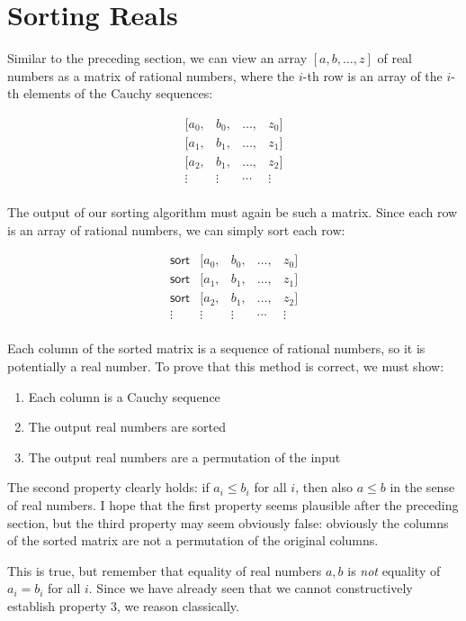 \documentclass[a4paper, 11pt]{article}
\newcommand{\sort}{\mathsf{sort}}
\begin{document}
\section{Sorting Reals}

Similar to the preceding section, we can view an array $[a, b,\dots,z]$ of real numbers as a matrix of rational numbers, where the $i$-th row is an array of the $i$-th elements of the Cauchy sequences:

\[
\begin{matrix}
  [a_0, & b_0, & \dots, & z_0] \\
  [a_1, & b_1, & \dots, & z_1] \\
  [a_2, & b_1, & \dots, & z_2] \\
  \vdots & \vdots & \cdots & \vdots \\
\end{matrix}
\]

The output of our sorting algorithm must again be such a matrix. Since each row is an array of rational numbers, we can simply sort each row:

\[
\begin{matrix}
  \sort &[a_0, & b_0, & \dots, & z_0] \\
  \sort &[a_1, & b_1, & \dots, & z_1] \\
  \sort &[a_2, & b_1, & \dots, & z_2] \\
  \vdots&  \vdots & \vdots & \cdots & \vdots \\
\end{matrix}
\]

Each column of the sorted matrix is a sequence of rational numbers, so it is potentially a real number. To prove that this method is correct, we must show:
\begin{enumerate}
  \item Each column is a Cauchy sequence
  \item The output real numbers are sorted
  \item The output real numbers are a permutation of the input
\end{enumerate}

\noindent The second property clearly holds: if $a_i \leq b_i$ for all $i$, then also $a \leq b$ in the sense of real numbers. I hope that the first property seems plausible after the preceding section, but the third property may seem obviously false: obviously the columns of the sorted matrix are not a permutation of the original columns.

This is true, but remember that equality of real numbers $a,b$ is \emph{not} equality of $a_i = b_i$ for all $i$. Since we have already seen that we cannot constructively establish property 3, we reason classically.
\end{document}
